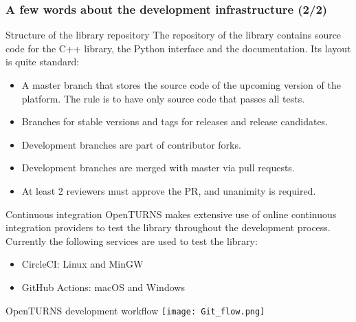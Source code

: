 \documentclass[8pt]{beamer}
\begin{document}
\begin{frame}
    \frametitle{A few words about the development infrastructure (2/2)}
    \begin{block}{Structure of the library repository}
    The repository of the library contains source code for the C++ library, the Python interface and the documentation. Its layout is quite standard:
    \begin{itemize}
    \item A \alert{master branch} that stores the source code of the upcoming version of the platform. The rule is to have only source code that passes all tests.
    \item Branches for \alert{stable versions} and \alert{tags for releases} and release candidates.
    \item Development branches are part of \alert{contributor forks}.
    \item Development branches are merged with master via \alert{pull requests}.
    \item At least \alert{2 reviewers must approve} the PR, and unanimity is required.
    \end{itemize}
  \end{block}

  \begin{block}{Continuous integration}
    OpenTURNS makes extensive use of online continuous integration providers to \alert{test the library} throughout the development process. Currently the following services are used to test the library:
    \begin{itemize}
    \item CircleCI: Linux and MinGW
    \item GitHub Actions: macOS and Windows
    \end{itemize}
  \end{block}
\end{frame}

\begin{frame}{OpenTURNS development workflow}
    \texttt{[image: Git\_flow.png]}
\end{frame}

\end{document}
